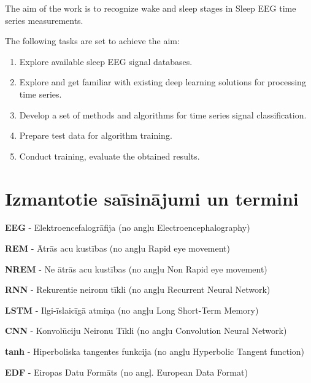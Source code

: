 \documentclass[12pt,paper=A4]{report}
\begin{document}
The aim of the work is to recognize wake and sleep stages in Sleep EEG time series measurements.

The following tasks are set to achieve the aim:
\begin{enumerate}
\item Explore available sleep EEG signal databases.

\item Explore and get familiar with existing deep learning solutions for processing time series.

\item Develop a set of methods and algorithms for time series signal classification.

\item Prepare test data for algorithm training.

\item Conduct training, evaluate the obtained results.
\end{enumerate}



    
\chapter*{Izmantotie saīsinājumi un termini}

\textbf{EEG} - Elektroencefalogrāfija (no angļu Electroencephalography)

\textbf{REM} - Ātrās acu kustības (no angļu Rapid eye movement)

\textbf{NREM} - Ne ātrās acu kustības (no angļu Non Rapid eye movement)

\textbf{RNN} - Rekurentie neironu tīkli (no angļu Recurrent Neural Network)

\textbf{LSTM} - Ilgi-īslaicīgā atmiņa (no angļu Long Short-Term Memory) 

\textbf{CNN} - Konvolūciju Neironu Tīkli (no angļu Convolution Neural Network)

\textbf{tanh} - Hiperboliska tangentes funkcija (no angļu Hyperbolic Tangent function)

\textbf{EDF} - Eiropas Datu Formāts (no angļ. European Data Format)
\end{document}
